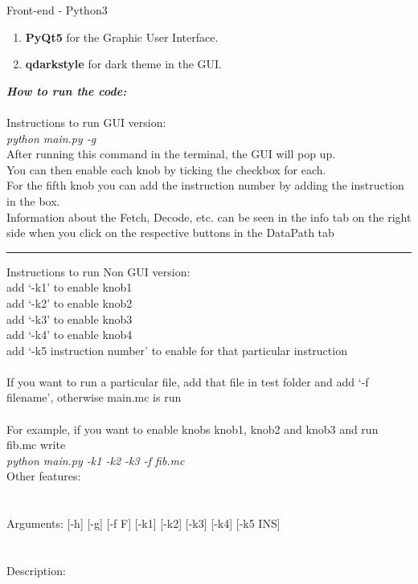 \documentclass{article}
\begin{document}
Front-end - Python3
\begin{enumerate}
  \item {\bf PyQt5} for the Graphic User Interface.
  \item {\bf qdarkstyle} for dark theme in the GUI.
\end{enumerate}
\newpage
\textsl{\textbf{How to run the code:}}\\\\
\textsf{Instructions to run GUI version:}\\
\textsl{python main.py -g}\\
After running this command in the terminal, the GUI will pop up.\\
You can then enable each knob by ticking the checkbox for each.\\
For the fifth knob you can add the instruction number by adding the instruction in the box.\\
Information about the Fetch, Decode, etc. can be seen in the info tab on the right side when you click on the respective buttons in the DataPath tab
\par\noindent\rule{\textwidth}{0.4pt}
\textsf{Instructions to run Non GUI version:}\\
add `-k1' to enable knob1\\
add `-k2' to enable knob2\\
add `-k3' to enable knob3\\
add `-k4' to enable knob4\\
add `-k5 instruction number' to enable for that particular instruction\\\\
If you want to run a particular file, add that file in test folder and add `-f filename', otherwise main.mc is run\\\\
For example, if you want to enable knobs knob1, knob2 and knob3  and run fib.mc write\\
\textsl{python main.py -k1 -k2 -k3 -f fib.mc}\\
\newpage
\noindent
\textsf{Other features:}\\\\
\\
Arguments: [-h] [-g] [-f F] [-k1] [-k2] [-k3] [-k4] [-k5 INS]
\\\\\\
\textsf{Description:}\\
\end{document}
